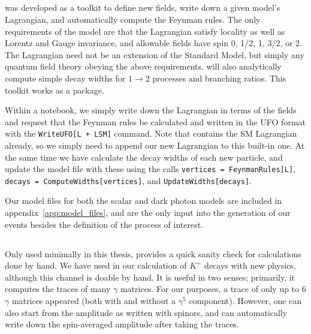 \subsection{\feynrules}
\feynrules was developed as a toolkit to define new fields, write down a given model's Lagrangian, and automatically compute the Feynman rules.
The only requirements of the model are that the Lagrangian satisfy locality as well as Lorentz and Gauge invariance, and allowable fields have spin 0, 1/2, 1, 3/2, or 2. The Lagrangian need not be an extension of the Standard Model, but simply any quantum field theory obeying the above requirements. 
\feynrules will also analytically compute simple decay widths for $1 \rightarrow 2$ processes and branching ratios.
This toolkit works as a \mathematica package.

Within a \mathematica notebook, we simply write down the Lagrangian in terms of the fields and request that the Feynman rules be calculated and written in the UFO format with the \texttt{WriteUFO[L + LSM]} command. Note that \feynrules contains the SM Lagrangian already, so we simply need to append our new Lagrangian to this built-in one.
At the same time we have \feynrules calculate the decay widths of each new particle, and update the model file with these using the calls \texttt{vertices = FeynmanRules[L]}, \texttt{decays = ComputeWidths[vertices]}, and \texttt{UpdateWidths[decays]}.

Our model files for both the scalar and dark photon models are included in appendix~\ref{app:model_files}, and are the only input into the generation of our events besides the definition of the process of interest.

\subsection{\feyncalc}
Only used minimally in this thesis, \feyncalc provides a quick sanity check for calculations done by hand.
We have used \feyncalc in our calculation of $K^+$ decays with new physics, although this channel is doable by hand.
It is useful in two senses; primarily, it computes the traces of many $\gamma$ matrices.
For our purposes, a trace of only up to 6 $\gamma$ matrices appeared (both with and without a $\gamma^5$ component).
However, one can also start from the amplitude as written with spinors, and \feyncalc can automatically write down the spin-averaged amplitude after taking the traces.

